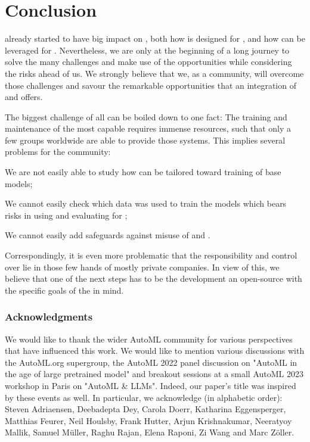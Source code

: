 \documentclass[10pt]{article} %
\begin{document}
\section{Conclusion}
\label{sec:conclusion}

\LLMs already started to have big impact on \AutoML, both how \AutoML is designed for \LLMs, and how \LLMs can be leveraged for \AutoML. 
Nevertheless, we are only at the beginning of a long journey to solve the many challenges and make use of the opportunities while considering the risks ahead of us. We strongly believe that we, as a community, will overcome those challenges and savour the remarkable opportunities that an integration of \LLMs and \AutoML offers.

The biggest challenge of all can be boiled down to one fact: The training and maintenance of the most capable \LLMs requires immense resources, such that only a few groups worldwide are able to provide those systems. This implies several problems for the community: \begin{inparaenum}[(i)]
    \item We are not easily able to study how \AutoML can be tailored toward training of \LLM base models;
    \item We cannot easily check which data was used to train the models which bears risks in using and evaluating \LLMs for \AutoML;
    \item We cannot easily add safeguards against misuse of \LLMs and \AutoML.
\end{inparaenum}
Correspondingly, it is even more problematic that the responsibility and control over \LLMs lie in those few hands of mostly private companies. In view of this, we believe that one of the next steps has to be the development an open-source \LLM with the specific goals of the \AutoML in mind.

\subsubsection*{Acknowledgments}
We would like to thank the wider AutoML community for various perspectives that have influenced this work. We would like to mention various discussions with the AutoML.org supergroup, the AutoML 2022 panel discussion on "AutoML in the age of large pretrained model" and breakout sessions at a small AutoML 2023 workshop in Paris on "AutoML \& LLMs". Indeed, our paper’s title was inspired by these events as well. In particular, we acknowledge (in alphabetic order): Steven Adriaensen, Deebadepta Dey, Carola Doerr, Katharina Eggensperger, Matthias Feurer, Neil Houlsby, Frank Hutter, Arjun Krishnakumar, Neeratyoy Mallik, Samuel Müller, Raghu Rajan, Elena Raponi, Zi Wang and Marc Zöller.
\end{document}
